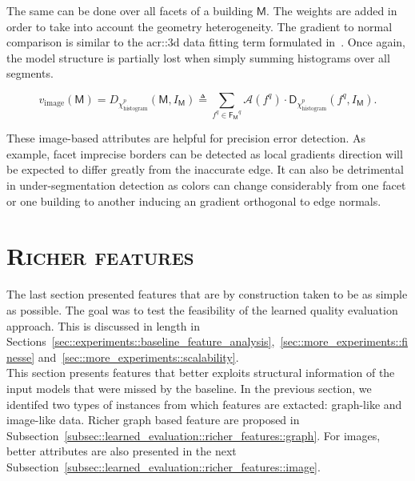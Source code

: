         The same can be done over all facets of a building $\mathsf{M}$.
        The weights are added in order to take into account the geometry heterogeneity.
        The gradient to normal comparison is similar to the \gls{acr::3d} data fitting term formulated in~\parencite{li2016manhattan}.
        Once again, the model structure is partially lost when simply summing histograms over all segments.

        \begin{equation}
            \label{eq::corr_bul}
            v_{\text{image}}\left(\mathsf{M}\right) = D_{\chi^p_{\operatorname{histogram}}}\left(\mathsf{M}, I_{\mathsf{M}}\right) \triangleq \sum_{f^q \in \mathsf{F_M}^q} \mathscr{A}\left(f^q\right) \cdot \mathsf{D}_{\chi^p_{\operatorname{histogram}}}(f^q, I_{\mathsf{M}}).
        \end{equation}
        
        These image-based attributes are helpful for precision error detection.
        As example, facet imprecise borders can be detected as local gradients direction will be expected to differ greatly from the inaccurate edge.
        It can also be detrimental in under-segmentation detection as colors can change considerably from one facet or one building to another inducing an gradient orthogonal to edge normals.

\section{\textsc{Richer features}}
    \label{sec::learned_evaluation::richer_features}
    The last section presented features that are by construction taken to be as simple as possible.
    The goal was to test the feasibility of the learned quality evaluation approach.
    This is discussed in length in Sections~\ref{sec::experiments::baseline_feature_analysis},~\ref{sec::more_experiments::finesse} and~\ref{sec::more_experiments::scalability}.\\

    This section presents features that better exploits structural information of the input models that were missed by the baseline.
    In the previous section, we identifed two types of instances from which features are extacted: graph-like and image-like data.
    Richer graph based feature are proposed in Subsection~\ref{subsec::learned_evaluation::richer_features::graph}.
    For images, better attributes are also presented in the next Subsection~\ref{subsec::learned_evaluation::richer_features::image}.


